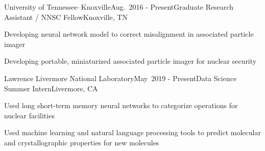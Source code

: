 
\begin{rSubsection}{University of Tennessee--Knoxville}{Aug.\ 2016 - Present}{Graduate Research Assistant / NNSC Fellow}{Knoxville, TN}
\item Developing neural network model to correct misalignment in associated particle imager
\item Developing portable, miniaturized associated particle imager for nuclear security
\end{rSubsection}


\begin{rSubsection}{Lawrence Livermore National Laboratory}{May\ 2019 - 
Present}{Data Science Summer Intern}{Livermore, CA}
\item Used long short-term memory neural networks to categorize operations for nuclear facilities
\item Used machine learning and natural language processing tools to predict molecular and crystallographic properties for new molecules
\end{rSubsection}



